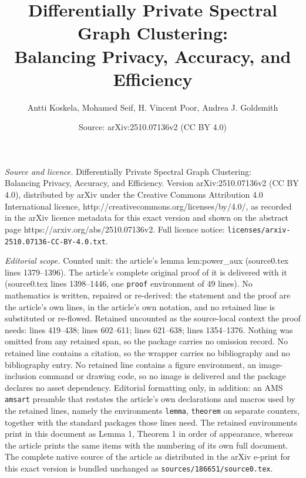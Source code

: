 \documentclass[10pt,a4paper]{amsart}
\title{Differentially Private Spectral Graph Clustering: \\ Balancing Privacy, Accuracy, and Efficiency}
\author{Antti Koskela, Mohamed Seif, H. Vincent Poor, Andrea J. Goldsmith}
\date{Source: arXiv:2510.07136v2 (CC BY 4.0)}
\begin{document}
\maketitle

\noindent\emph{Source and licence.} Differentially Private Spectral Graph Clustering: \\ Balancing Privacy, Accuracy, and Efficiency. Version arXiv:2510.07136v2 (CC BY 4.0), distributed by arXiv under the Creative Commons Attribution 4.0 International licence, http://creativecommons.org/licenses/by/4.0/, as recorded in the arXiv licence metadata for this exact version and shown on the abstract page https://arxiv.org/abs/2510.07136v2. Full licence notice: \texttt{licenses/arxiv-2510.07136-CC-BY-4.0.txt}.\par\smallskip

\noindent\textit{Editorial scope.} Counted unit: the article's lemma lem:power\_aux (source0.tex lines 1379--1396). The article's complete original proof of it is delivered with it (source0.tex lines 1398--1446, one \texttt{proof} environment of 49 lines). No mathematics is written, repaired or re-derived: the statement and the proof are the article's own lines, in the article's own notation, and no retained line is substituted or re-flowed.  Retained uncounted as the source-local context the proof needs: lines 419--438; lines 602--611; lines 621--638; lines 1354--1376.  Nothing was omitted from any retained span, so the package carries no omission record.  No retained line contains a citation, so the wrapper carries no bibliography and no bibliography entry.  No retained line contains a figure environment, an image-inclusion command or drawing code, so no image is delivered and the package declares no asset dependency.  Editorial formatting only, in addition: an AMS \texttt{amsart} preamble that restates the article's own declarations and macros used by the retained lines, namely the environments \texttt{lemma}, \texttt{theorem} on separate counters, together with the standard packages those lines need.  The retained environments print in this document as Lemma 1, Theorem 1 in order of appearance, whereas the article prints the same items with the numbering of its own full document.  The complete native source of the article as distributed in the arXiv e-print for this exact version is bundled unchanged as \texttt{sources/186651/source0.tex}.
\end{document}
